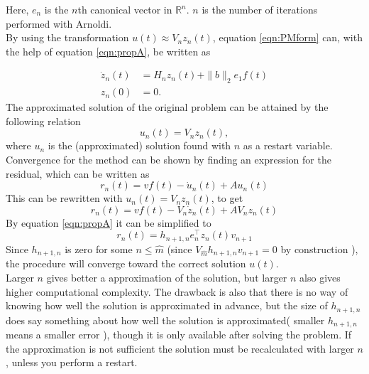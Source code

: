 Here, $e_n$ is the $n$th canonical vector in $\mathbb{R}^n$. $n$ is the number of iterations performed with Arnoldi.\\

By using the transformation $u(t) \approx V_n z_n(t)$, equation \eqref{eqn:PMform} can, with the help of equation \eqref{eqn:propA}, be written as

\begin{equation}
\begin{aligned}
\dot{z}_n(t) &= H_n z_n(t) + \| b\|_2 e_1 f(t)  \\
z_n(0) &= 0.
\label{eqn:KPMi}
\end{aligned}
\end{equation}
The approximated solution of the original problem can be attained by the following relation
\begin{equation*}
u_n(t) = V_n z_n(t),
\end{equation*}
where $u_n$ is the (approximated) solution found with $n$ as a restart variable. \\

Convergence for the method can be shown by finding an expression for the residual, which can be written as
\begin{equation*}
r_n(t) = v f(t) -\dot{u}_n(t) + A u_n(t)
\end{equation*}
This can be rewritten with $u_n(t) = V_n z_n(t)$, to get
\begin{equation*}
r_n(t) = v f(t) - V_n \dot{z}_n(t) + A V_n z_n(t)
\end{equation*}
By equation \eqref{eqn:propA} it can be simplified to
\begin{equation}
r_n(t) = h_{n+1,n} e_n^\top z_n(t) v_{n+1}
\label{eqn:Aresidual}
\end{equation}
Since $h_{n+1,n}$ is zero for some $n \leq \hat{m}$ (since $V_{\hat{m}} h_{n+1,n} v_{n+1} = 0 $ by construction ), the procedure will converge toward the correct solution $u(t)$. \\

Larger $n$ gives better a approximation of the solution, but larger $n$ also gives higher computational complexity. The drawback is also that there is no way of knowing how well the solution is approximated in advance, but the size of $h_{n+1,n}$ does say something about how well the solution is approximated( smaller $h_{n+1,n}$ means a smaller error ), though it is only available after solving the problem. If the approximation is not sufficient the solution must be recalculated with larger $n$, unless you perform a restart. \\


